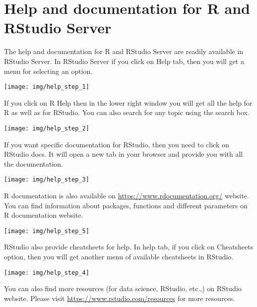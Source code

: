 \documentclass[
]{book}
\begin{document}
\hypertarget{help-and-documentation-for-r-and-rstudio-server}{%
\section{Help and documentation for R and RStudio Server}\label{help-and-documentation-for-r-and-rstudio-server}}

The help and documentation for R and RStudio Server are readily available in RStudio Server. In RStudio Server if you click on Help tab, then you will get a menu for selecting an option.

\begin{center}\texttt{[image: img/help\_step\_1]} \end{center}

If you click on R Help then in the lower right window you will get all the help for R as well as for RStudio. You can also search for any topic using the search box.

\begin{center}\texttt{[image: img/help\_step\_2]} \end{center}

If you want specific documentation for RStudio, then you need to click on RStudio docs. It will open a new tab in your browser and provide you with all the documentation.

\begin{center}\texttt{[image: img/help\_step\_3]} \end{center}

R documentation is also available on \url{https://www.rdocumentation.org/} website. You can find information about packages, functions and different parameters on R documentation website.

\begin{center}\texttt{[image: img/help\_step\_5]} \end{center}

RStudio also provide cheatsheets for help. In help tab, if you click on Cheatsheets option, then you will get another menu of available cheatsheets in RStudio.

\begin{center}\texttt{[image: img/help\_step\_4]} \end{center}

You can also find more resources (for data science, RStudio, etc.,) on RStudio website. Please visit \url{https://www.rstudio.com/resources} for more resources.
\end{document}
